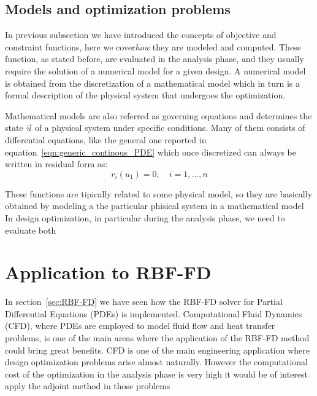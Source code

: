 
\subsection{Models and optimization problems}

In previous subsection we have introduced the concepts of objective and constraint functions, here we cover\emph{how} they are modeled and computed. These function, as stated before, are evaluated in the analysis phase, and they usually require the solution of a numerical model for a given design. A numerical model is obtained from the discretization of a mathematical model which in turn is a formal description of the physical system that undergoes the optimization.

\smallskip
Mathematical models are also referred as governing equations and determines the state $\vec{u}$ of a physical system under specific conditions. Many of them consists of differential equations, like the general one reported in equation~\eqref{eqn:generic_continous_PDE} which once discretized can always be written in residual form as:
\begin{equation}
	r_i(u_1) = 0, \quad i=1, \dots, n
\end{equation}


These functions are tipically related to some physical model, so they are basically obtained by modeling a the particular phisical system in a mathematical model
In design optimization, in particular during the analysis phase, we need to evaluate both 

\section{Application to RBF-FD}

In section~\vref{sec:RBF-FD} we have seen how the RBF-FD solver for Partial Differential Equations (PDEs) is implemented. Computational Fluid Dynamics (CFD), where PDEs are employed to model fluid flow and heat transfer problems, is one of the main areas where the application of the RBF-FD method could bring great benefits.
CFD is one of the main engineering application where design optimization problems arise almost naturally. However the computational cost of the optimization in the analysis phase is very high it would be of interest apply the adjoint method in those problems

